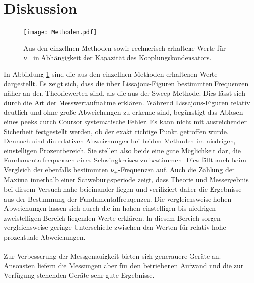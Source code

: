 \section{Diskussion}
\begin{figure}
  \centering
  \texttt{[image: Methoden.pdf]}
  \caption{Aus den einzellnen Methoden sowie rechnerisch erhaltene Werte für $\nu_-$ in
  Abhängigkeit der Kapazität des Kopplungskondensators.}
  \label{abb:1}
\end{figure}
In Abbildung \ref{abb:1} sind die aus den einzellnen Methoden erhaltenen Werte dargestellt.
Es zeigt sich, dass die über Lissajous-Figuren bestimmten Frequenzen näher an den Theoriewerten
sind, als die aus der Sweep-Methode. Dies lässt sich durch die Art der Messwertaufnahme erklären.
Während Lissajous-Figuren relativ deutlich und ohne große Abweichungen zu erkenne sind,
begünstigt das Ablesen eines peeks durch Coursor systematische Fehler. Es kann nicht
mit ausreichender Sicherheit festgestellt werden, ob der exakt richtige Punkt getroffen wurde.
Dennoch sind die relativen Abweichungen bei beiden Methoden im niedrigen, einstelligen Prozentbereich.
Sie stellen also beide eine gute Möglichkeit dar, die Fundamentalfrequenzen eines Schwingkreises
zu bestimmen. Dies fällt auch beim Vergleich der ebenfalls bestimmten $\nu_+$-Frequenzen auf.
Auch die Zählung der Maxima innerhalb einer Schwebungsperiode zeigt, dass
Theorie und Messergebnis bei diesem Versuch nahe beieinander liegen und verifiziert daher die
Ergebnisse aus der Bestimmung der Fundamentalfreuqenzen. Die vergleichsweise hohen Abweichungen
lassen sich durch die im hohen einstelligen bis niedrigen zweistelligen Bereich liegenden Werte
erklären. In diesem Bereich sorgen vergleichsweise geringe Unterschiede zwischen den Werten
für relativ hohe prozentuale Abweichungen.\\
\\
Zur Verbesserung der Messgenauigkeit bieten sich generauere Geräte an. Ansonsten liefern die
Messungen aber für den betriebenen Aufwand und die zur Verfügung stehenden Geräte sehr gute
Ergebnisse.
\newpage
\nocite{*}
\printbibliography
